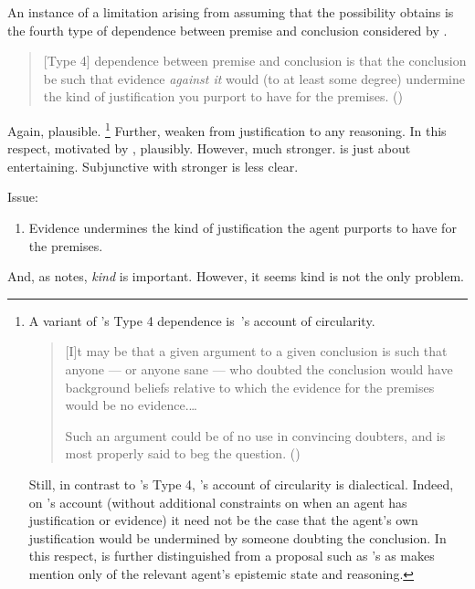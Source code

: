 \begin{note}
  An instance of a limitation arising from assuming that the possibility obtains is the fourth type of dependence between premise and conclusion considered by \citeauthor{Pryor:2004ws}.

  \begin{quote}
    [Type 4] dependence between premise and conclusion is that the conclusion be such that evidence \emph{against it} would (to at least some degree) undermine the kind of justification you purport to have for the premises.\nolinebreak
    \mbox{}\hfill\mbox{(\citeyear[359]{Pryor:2004ws})}
  \end{quote}

  Again, plausible.\nolinebreak
  \footnote{
    A variant of \citeauthor{Pryor:2004ws}'s Type 4 dependence is~\citeauthor{Jackson:1984vk}'s account of circularity.
    \begin{quote}
      [I]t may be that a given argument to a given conclusion is such that anyone --- or anyone sane --- who doubted the conclusion would have background beliefs relative to which the evidence for the premises would be no evidence.\space \dots

      Such an argument could be of no use in convincing doubters, and is most properly said to beg the question.\nolinebreak
      \mbox{}\hfill\mbox{(\Citeyear[111-12]{Jackson:1984vk})}
    \end{quote}
    Still, in contrast to \citeauthor{Pryor:2004ws}'s Type 4, \citeauthor{Jackson:1984vk}'s account of circularity is dialectical.
    Indeed, on \citeauthor{Jackson:1984vk}'s account (without additional constraints on when an agent has justification or evidence) it need not be the case that the agent's own justification would be undermined by someone doubting the conclusion.
    In this respect, \ideaCS{} is further distinguished from a proposal such as \citeauthor{Jackson:1984vk}'s as \ideaCS{} makes mention only of the relevant agent's epistemic state and reasoning.
  }
  Further, weaken from justification to any reasoning.
  In this respect, motivated by \ideaS{}, plausibly.
  However, much stronger.
  \ideaS{} is just about entertaining.
  Subjunctive with stronger is less clear.

  Issue:
  \begin{enumerate}
  \item Evidence undermines the kind of justification the agent purports to have for the premises.
  \end{enumerate}

  And, as \citeauthor{Pryor:2004ws} notes, \emph{kind} is important.
  However, it seems kind is not the only problem.
\end{note}

